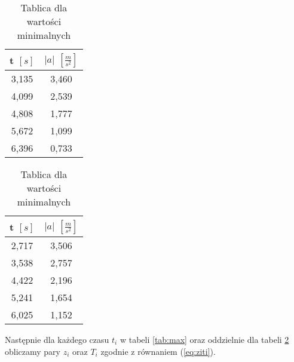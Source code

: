 \documentclass[a4paper,12pt]{article}
\begin{document}
\begin{table}[h]
	\begin{minipage}[c]{.45\textwidth}
		\begin{center}
			\begin{tabular}{ |c|c| }
				\hline
				t $\left[s\right]$ & $\left|a\right|$ $\left[\frac{m}{s^2}\right]$ \\\hline\hline
				3,135              & 3,460                                         \\\hline
				4,099              & 2,539                                         \\\hline
				4,808              & 1,777                                         \\\hline
				5,672              & 1,099                                         \\\hline
				6,396              & 0,733                                         \\\hline
			\end{tabular}
			\caption{Tablica dla wartości maksymalnych}\label{tab:max}
		\end{center}
	\end{minipage}\hspace{1cm}
	\begin{minipage}[c]{.45\textwidth}
		\begin{center}
			\begin{tabular}{ |c|c| }
				\hline
				t $\left[s\right]$ & $\left|a\right|$ $\left[\frac{m}{s^2}\right]$ \\\hline\hline
				2,717              & 3,506                                         \\\hline
				3,538              & 2,757                                         \\\hline
				4,422              & 2,196                                         \\\hline
				5,241              & 1,654                                         \\\hline
				6,025              & 1,152                                         \\\hline
			\end{tabular}
			\caption{Tablica dla wartości minimalnych}\label{tab:min}
		\end{center}
	\end{minipage}
\end{table}

Następnie dla każdego czasu $t_i$ w tabeli \ref{tab:max} oraz oddzielnie dla tabeli \ref{tab:min} obliczamy pary $z_i$ oraz $T_i$ zgodnie z równaniem (\ref{eq:ziti}).
\end{document}
